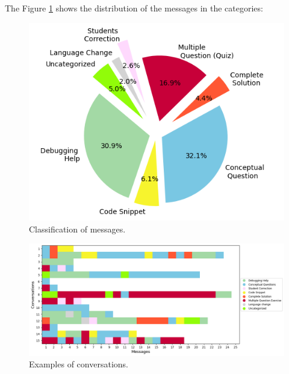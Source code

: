 \documentclass[a4paper,twoside]{article}
\begin{document}
The Figure \ref{fig:graph1} shows the distribution of the messages in the
categories:

\begin{figure}[h!]
    \centering
    \includegraphics[scale=0.62]{img/figure1.png}
    \caption{Classification of messages.}
    \label{fig:graph1}
\end{figure}

\begin{figure}[htbp]
  \centering
  \includegraphics[scale=0.52]{img/figure2.png}
  \caption{Examples of conversations.}
  \label{fig:graph2}
\end{figure}


\end{document}
